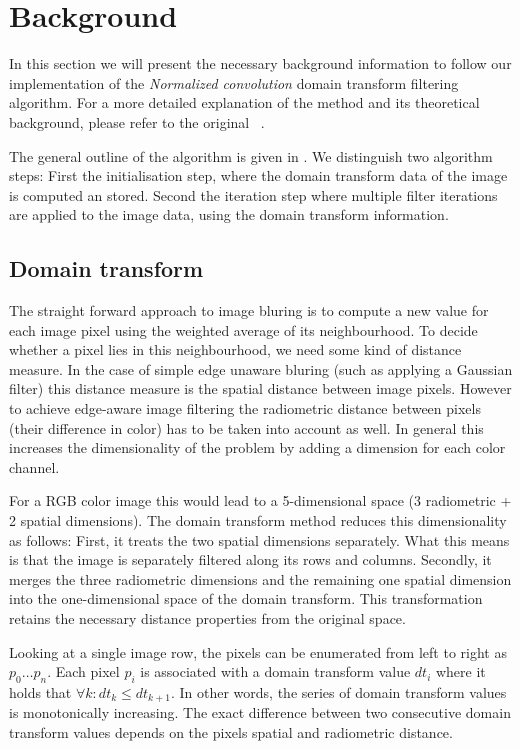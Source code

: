 \section{Background}\label{sec:background}

In this section we will present the necessary background information to follow our implementation of the \textit{Normalized convolution} domain transform filtering algorithm. For a more detailed explanation of the method and its theoretical background, please refer to the original ~\cite{GastalOliveira2011DomainTransform}.

The general outline of the algorithm is given in . We distinguish two algorithm steps: First the initialisation step, where the domain transform data of the image is computed an stored. Second the iteration step where multiple filter iterations are applied to the image data, using the domain transform information.

\subsection{Domain transform}

The straight forward approach to image bluring is to compute a new value for each image pixel using the weighted average of its neighbourhood. To decide whether a pixel lies in this neighbourhood, we need some kind of distance measure. In the case of simple edge unaware bluring (such as applying a Gaussian filter) this distance measure is the spatial distance between image pixels. However to achieve edge-aware image filtering the radiometric distance between pixels (their difference in color) has to be taken into account as well.
In general this increases the dimensionality of the problem by adding a dimension for each color channel.

For a RGB color image this would lead to a 5-dimensional space (3 radiometric + 2 spatial dimensions). The domain transform method reduces this dimensionality as follows:
First, it treats the two spatial dimensions separately. What this means is that the image is separately filtered along its rows and columns. Secondly, it merges the three radiometric dimensions and the remaining one spatial dimension into the one-dimensional space of the domain transform. This transformation retains the necessary distance properties from the original space.

Looking at a single image row, the pixels can be enumerated from left to right as $ p_0 \dots p_n$. Each pixel $p_i$ is associated with a domain transform value $dt_i$ where it holds that $\forall k : dt_k \leq dt_{k+1}$. In other words, the series of domain transform values is monotonically increasing. The exact difference between two consecutive domain transform values depends on the pixels spatial and radiometric distance.


